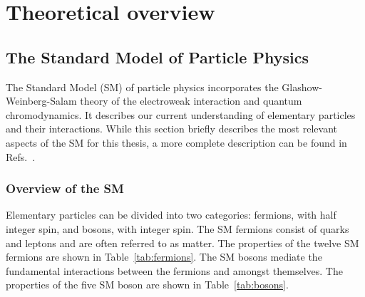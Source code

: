 \section{Theoretical overview}
\label{sec:theory}

\subsection{The Standard Model of Particle Physics}

The Standard Model (SM) of particle physics incorporates the Glashow-Weinberg-Salam theory of the electroweak interaction and quantum chromodynamics. It describes our current understanding of elementary particles and their interactions. While this section briefly describes the most relevant aspects of the SM for this thesis, a more complete description can be found in Refs.~\cite{griffiths,halzen}.

\subsubsection{Overview of the SM}

Elementary particles can be divided into two categories: fermions, with half integer spin, and bosons, with integer spin. The SM fermions consist of quarks and leptons and are often referred to as matter. The properties of the twelve SM fermions are shown in Table~\ref{tab:fermions}. The SM bosons mediate the fundamental interactions between the fermions and amongst themselves. The properties of the five SM boson are shown in Table~\ref{tab:bosons}.

